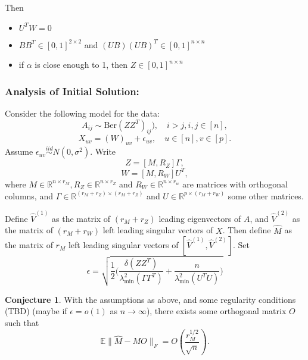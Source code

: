 \documentclass[notheorems]{beamer}
\theoremstyle{definition}
\newtheorem{conj}[definition]{Conjecture}
\newcommand{\al}{\alpha}
\newcommand{\Gam}{\Gamma}
\newcommand{\del}{\delta}
\newcommand{\lam}{\lambda}
\newcommand{\ep}{\epsilon}
\newcommand{\R}{\mathbb{R}}
\begin{document}
\begin{frame}
Then
\begin{itemize}
    \item $U^TW = 0$
    \item $BB^T \in [0,1]^{2 \times 2}$ and $(UB)(UB)^T \in [0,1]^{n \times n}$
    \item if $\al$ is close enough to 1, then $Z \in  [0,1]^{n \times n}$
    \end{itemize}

\end{frame}















\begin{frame}
\frametitle{Analysis of Initial Solution:} 
Consider the following model for the data:
$$A_{ij}\sim \text{Ber}(ZZ^T)_{ij}), \quad i>j,i,j\in[n],$$
$$X_{uv}= (W)_{uv} + \epsilon_{uv}, \quad u\in[n], v \in [p].$$
Assume $\epsilon_{uv} \overset{iid}{\sim} N(0, \sigma^2)$. Write 
$$Z = [M, R_Z] \Gamma,$$
$$W = [M, R_W] U^T,$$
where $M\in\R^{n\times r_M}, R_Z\in\R^{n\times r_Z}$ and $R_W\in\R^{n\times r_w}$ are matrices with orthogonal columns, and $\Gamma\in\R^{(r_M + r_Z)\times (r_M + r_Z)}$ and $U\in\R^{p\times (r_M + r_W)}$ some other matrices.

\end{frame}






\begin{frame}

Define $\hat{V}^{(1)}$ as the matrix of $(r_M + r_Z)$ leading eigenvectors of $A$, and $\hat{V}^{(2)}$ as the matrix of $(r_M + r_W)$ left leading singular vectors of $X$. Then define $\hat{M}$ as the matrix of $r_M$ left leading singular vectors of $[\hat{V}^{(1)}, \hat{V}^{(2)}]$. Set $$\epsilon = \sqrt{\frac{1}{2}\bigg(\frac{\del(ZZ^T)}{\lam^2_{\min}(\Gam \Gam^T)} + \frac{n}{\lam^2_{\min}(U^TU)}  \bigg)}$$

\begin{conj}
With the assumptions as above, and some regularity conditions (TBD) (maybe if $\ep = o(1)$ as $n \rightarrow \infty$), there exists some orthogonal matrix $O$ such that
$$\mathbb{E}\|\hat{M} - MO\|_F = O\left(\frac{r_M^{1/2}}{\sqrt{n}}\right).$$
\end{conj}
\end{frame}
\end{document}
